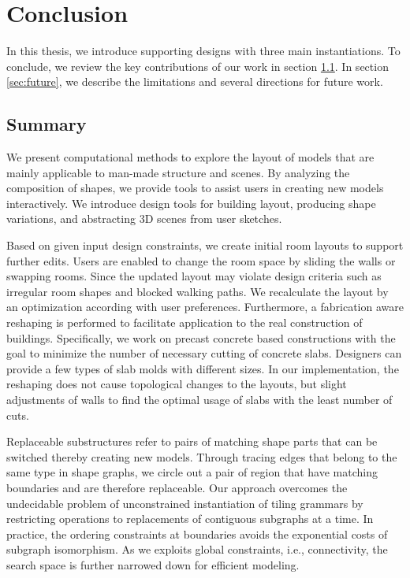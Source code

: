 

\chapter{Conclusion}
\label{chapter:conclusion}

In this thesis, we introduce supporting designs with three main instantiations. To conclude, we review the key contributions of our work in section \ref{sec:summary}. In section \ref{sec:future}, we describe the limitations and several directions for future work.

\section{Summary}
\label{sec:summary}

We present computational methods to explore the layout of models that are mainly applicable to man-made structure and scenes. By analyzing the composition of shapes, we provide tools to assist users in creating new models interactively. We introduce design tools for building layout, producing shape variations, and abstracting 3D scenes from user sketches.

 Based on given input design constraints, we create initial room layouts to support further edits. Users are enabled to change the room space by sliding the walls or swapping rooms. Since the updated layout may violate design criteria such as irregular room shapes and blocked walking paths. We recalculate the layout by an optimization according with user preferences. Furthermore, a fabrication aware reshaping is performed to facilitate application to the real construction of buildings. Specifically, we work on precast concrete based constructions with the goal to minimize the number of necessary cutting of concrete slabs. Designers can provide a few types of slab molds with different sizes. In our implementation, the reshaping does not cause topological changes to the layouts, but slight adjustments of walls to find the optimal usage of slabs with the least number of cuts.


%
Replaceable substructures refer to pairs of matching shape parts that can be switched thereby creating new models. Through tracing edges that belong to the same type in shape graphs, we circle out a pair of region that have matching boundaries and are therefore replaceable. Our approach overcomes the undecidable problem of unconstrained instantiation of tiling grammars by restricting operations to replacements of contiguous subgraphs at a time. In practice, the ordering constraints at boundaries avoids the exponential costs of subgraph isomorphism. As we exploits global constraints, i.e., connectivity, the search space is further narrowed down for efficient modeling.

